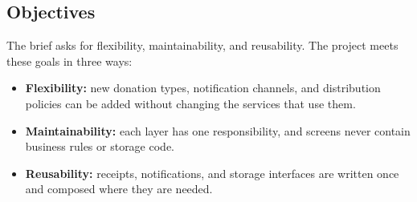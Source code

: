 \subsection{Objectives}

The brief asks for flexibility, maintainability, and reusability. The project meets these goals in three ways:

\begin{itemize}
  \item \textbf{Flexibility:} new donation types, notification channels, and distribution policies can be added without changing the services that use them.
  \item \textbf{Maintainability:} each layer has one responsibility, and screens never contain business rules or storage code.
  \item \textbf{Reusability:} receipts, notifications, and storage interfaces are written once and composed where they are needed.
\end{itemize}
